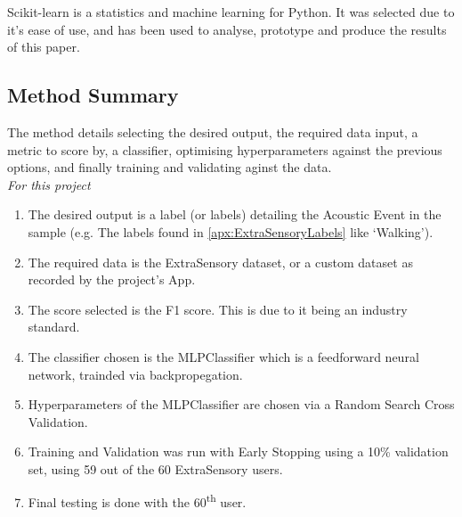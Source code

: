 \documentclass{UoNMCHA}
\newcommand{\flagforreview}{\textsuperscript{\color{red} [FLAGGED FOR REVIEW]}}
\newcommand{\inlineQuote}[1]{``#1''}
\numberwithin{equation}{section}
\begin{document}
Scikit-learn is a statistics and machine learning for Python. It was selected due to it's ease of use, and has been used to analyse, prototype and produce the results of this paper.

\subsection{Method Summary}

The method details selecting the desired output, the required data input, a metric to score by, a classifier, optimising hyperparameters against the previous options, and finally training and validating aginst the data. \\

{\itshape For this project}
\begin{enumerate}
    \item The desired output is a label (or labels) detailing the Acoustic Event in the sample (e.g. The labels found in \ref{apx:ExtraSensoryLabels} like `Walking').
    \item The required data is the ExtraSensory dataset, or a custom dataset as recorded by the project's App.
    \item The score selected is the F1 score. This is due to it being an industry standard.
    \item The classifier chosen is the MLPClassifier which is a feedforward neural network, trainded via backpropegation.
    \item Hyperparameters of the MLPClassifier are chosen via a Random Search Cross Validation.
    \item Training and Validation was run with Early Stopping using a 10\% validation set, using 59 out of the 60 ExtraSensory users.
    \item Final testing is done with the 60\textsuperscript{th} user.
\end{enumerate}




\end{document}
